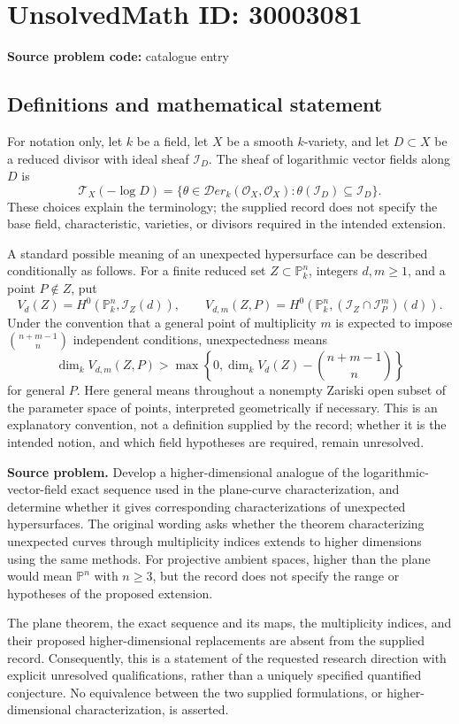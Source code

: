 \documentclass[11pt]{article}
\newcommand{\PP}{\mathbb{P}}
\begin{document}
\section*{UnsolvedMath ID: 30003081}
\textbf{Source problem code:} catalogue entry
\subsection{Definitions and mathematical statement}
For notation only, let \(k\) be a field, let \(X\) be a smooth \(k\)-variety, and let \(D\subset X\) be a reduced divisor with ideal sheaf \(\mathcal I_D\). The sheaf of logarithmic vector fields along \(D\) is
\[
\mathcal T_X(-\log D)
=
\{\theta\in\mathcal{D}er_k(\mathcal O_X,\mathcal O_X):
\theta(\mathcal I_D)\subseteq\mathcal I_D\}.
\]
These choices explain the terminology; the supplied record does not specify the base field, characteristic, varieties, or divisors required in the intended extension.

A standard possible meaning of an unexpected hypersurface can be described conditionally as follows. For a finite reduced set \(Z\subset\PP^n_k\), integers \(d,m\geq1\), and a point \(P\notin Z\), put
\[
V_d(Z)=H^0(\PP^n_k,\mathcal I_Z(d)),\qquad
V_{d,m}(Z,P)=H^0(\PP^n_k,(\mathcal I_Z\cap\mathcal I_P^m)(d)).
\]
Under the convention that a general point of multiplicity \(m\) is expected to impose \(\binom{n+m-1}{n}\) independent conditions, unexpectedness means
\[
\dim_k V_{d,m}(Z,P)>
\max\left\{0,\dim_k V_d(Z)-\binom{n+m-1}{n}\right\}
\]
for general \(P\). Here general means throughout a nonempty Zariski open subset of the parameter space of points, interpreted geometrically if necessary. This is an explanatory convention, not a definition supplied by the record; whether it is the intended notion, and which field hypotheses are required, remain unresolved.

\textbf{Source problem.} Develop a higher-dimensional analogue of the logarithmic-vector-field exact sequence used in the plane-curve characterization, and determine whether it gives corresponding characterizations of unexpected hypersurfaces. The original wording asks whether the theorem characterizing unexpected curves through multiplicity indices extends to higher dimensions using the same methods. For projective ambient spaces, higher than the plane would mean \(\PP^n\) with \(n\geq3\), but the record does not specify the range or hypotheses of the proposed extension.

The plane theorem, the exact sequence and its maps, the multiplicity indices, and their proposed higher-dimensional replacements are absent from the supplied record. Consequently, this is a statement of the requested research direction with explicit unresolved qualifications, rather than a uniquely specified quantified conjecture. No equivalence between the two supplied formulations, or higher-dimensional characterization, is asserted.
\end{document}
